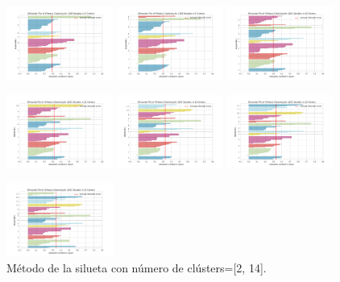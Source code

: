 \documentclass[10pt, a4paper]{article}
\begin{document}
\begin{figure}[hbt!]
			\includegraphics[width = 3.5cm]{silhouette_visualization_8_bf.png}
			\includegraphics[width = 3.5cm]{silhouette_visualization_9_bf.png}
			\includegraphics[width = 3.5cm]{silhouette_visualization_10_bf.png}
		
			\includegraphics[width = 3.5cm]{silhouette_visualization_11_bf.png}
			\includegraphics[width = 3.5cm]{silhouette_visualization_12_bf.png}
			\includegraphics[width = 3.5cm]{silhouette_visualization_13_bf.png}
			
			\includegraphics[width = 3.5cm]{silhouette_visualization_14_bf.png}
			
			\caption{M\'etodo de la silueta con n\'umero de cl\'usters=[2, 14].}
		\end{figure}
		
\end{document}
